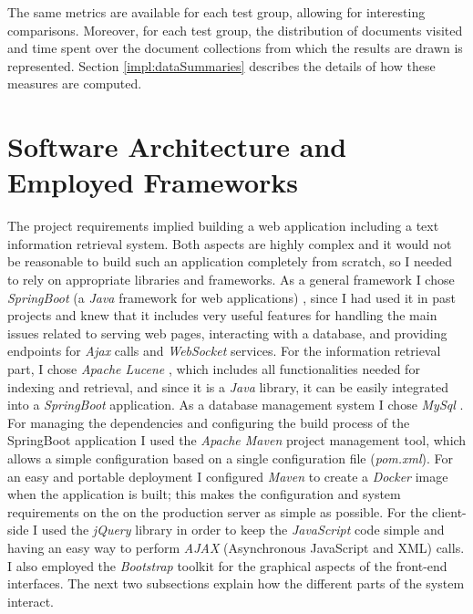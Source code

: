 \documentclass[a4paper]{usiinfbachelorproject}
\begin{document}
The same metrics are available for each test group, allowing for interesting comparisons. Moreover, for each test group, the distribution
of documents visited and time spent over the document collections from which the results are drawn is represented.
Section \ref{impl:dataSummaries} describes the details of how these measures are computed.

\newpage

\section{\textbf{Software Architecture and Employed Frameworks}} \label{sec:arch}

The project requirements implied building a web application including a text information retrieval system. Both aspects are highly complex and it would not be reasonable to build such an application completely from scratch, so I
needed to rely on appropriate libraries and frameworks. As a general framework I chose \emph{SpringBoot} 
(a \emph{Java} framework for web applications) \cite{springBootHome}, since
I had used it in past projects and knew that it includes very useful features for handling the main issues related to
serving web pages, interacting with a database, and providing endpoints for \emph{Ajax} calls and \emph{WebSocket} services.
For the information retrieval part, I chose \emph{Apache Lucene} \cite{luceneHome}, which includes all functionalities needed for indexing and retrieval,
and since it is a \emph{Java} library, it can be easily integrated into a \emph{SpringBoot} application. As a database management system
I chose \emph{MySql} \cite{MySQLhome}.
For managing the dependencies and configuring the build process of the SpringBoot application I used the \emph{Apache Maven}
project management tool, which allows a simple configuration based on a single configuration file (\emph{pom.xml}).
For an easy and portable deployment I configured \emph{Maven} to create a \emph{Docker} \cite{dockerHome} image when the application is built;
this makes the configuration and system requirements on the on the production server as simple as possible.  
For the client-side I used the \emph{jQuery}\cite{jQueryHome} library in order to keep the \emph{JavaScript} code simple
and having an easy way to perform \emph{AJAX} (Asynchronous JavaScript and XML) calls. I also employed the
\emph{Bootstrap} \cite{bootstrapHome} toolkit for the graphical aspects of the front-end interfaces.
The next two subsections explain how the different parts of the system interact.
\end{document}
